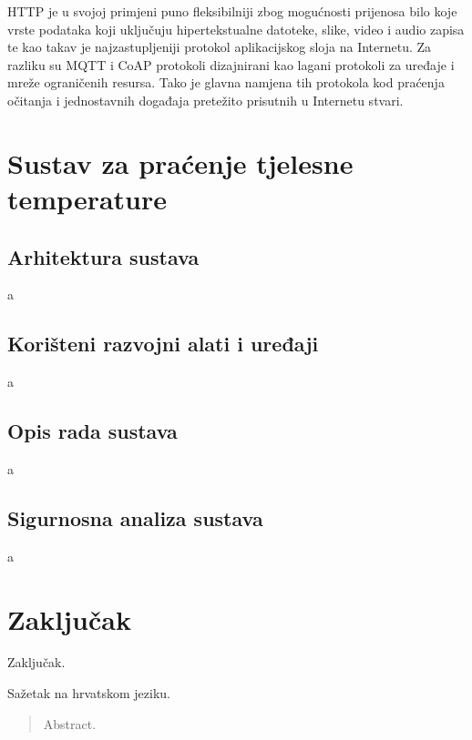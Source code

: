 \documentclass[times, utf8, diplomski]{fer}
\begin{document}
HTTP je u svojoj primjeni puno fleksibilniji zbog mogućnosti prijenosa bilo koje vrste podataka koji uključuju hipertekstualne datoteke, slike, video i audio zapisa te kao takav je najzastupljeniji protokol aplikacijskog sloja na Internetu. Za razliku su MQTT i CoAP protokoli dizajnirani kao lagani protokoli za uređaje i mreže ograničenih resursa. Tako je glavna namjena tih protokola kod praćenja očitanja i jednostavnih događaja pretežito prisutnih u Internetu stvari.

\chapter{Sustav za praćenje tjelesne temperature}

\section{Arhitektura sustava}
a

\section{Korišteni razvojni alati i uređaji}
a

\section{Opis rada sustava}
a

\section{Sigurnosna analiza sustava}
a


\chapter{Zaključak}
Zaključak.



\listoffigures
\listoftables

\begin{sazetak}
Sažetak na hrvatskom jeziku.

\end{sazetak}

\begin{abstract}
Abstract.

\end{abstract}
\end{document}
